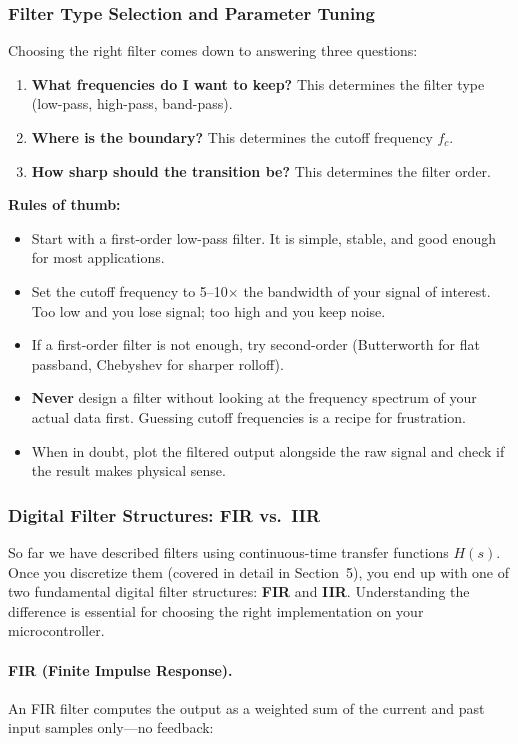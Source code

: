 \subsubsection{Filter Type Selection and Parameter Tuning}

Choosing the right filter comes down to answering three questions:
\begin{enumerate}
    \item \textbf{What frequencies do I want to keep?} This determines the filter type (low-pass, high-pass, band-pass).
    \item \textbf{Where is the boundary?} This determines the cutoff frequency $f_c$.
    \item \textbf{How sharp should the transition be?} This determines the filter order.
\end{enumerate}

\textbf{Rules of thumb:}
\begin{itemize}
    \item Start with a first-order low-pass filter. It is simple, stable, and good enough for most applications.
    \item Set the cutoff frequency to 5--10$\times$ the bandwidth of your signal of interest. Too low and you lose signal; too high and you keep noise.
    \item If a first-order filter is not enough, try second-order (Butterworth for flat passband, Chebyshev for sharper rolloff).
    \item \textbf{Never} design a filter without looking at the frequency spectrum of your actual data first. Guessing cutoff frequencies is a recipe for frustration.
    \item When in doubt, plot the filtered output alongside the raw signal and check if the result makes physical sense.
\end{itemize}

\subsubsection{Digital Filter Structures: FIR vs.\ IIR}

So far we have described filters using continuous-time transfer functions $H(s)$.
Once you discretize them (covered in detail in Section~5), you end up with one of
two fundamental digital filter structures: \textbf{FIR} and \textbf{IIR}.
Understanding the difference is essential for choosing the right implementation on
your microcontroller.

\paragraph{FIR (Finite Impulse Response).}
An FIR filter computes the output as a weighted sum of the current and past input
samples only---no feedback:

